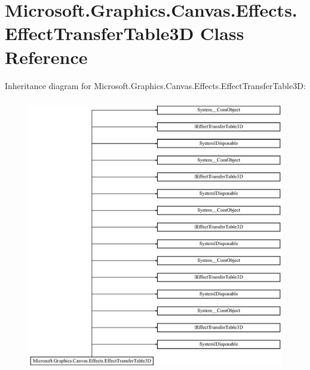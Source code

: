 \hypertarget{class_microsoft_1_1_graphics_1_1_canvas_1_1_effects_1_1_effect_transfer_table3_d}{}\section{Microsoft.\+Graphics.\+Canvas.\+Effects.\+Effect\+Transfer\+Table3D Class Reference}
\label{class_microsoft_1_1_graphics_1_1_canvas_1_1_effects_1_1_effect_transfer_table3_d}
Inheritance diagram for Microsoft.\+Graphics.\+Canvas.\+Effects.\+Effect\+Transfer\+Table3D\+:\begin{figure}[H]
\begin{center}
\leavevmode
\includegraphics[height=12.000000cm]{class_microsoft_1_1_graphics_1_1_canvas_1_1_effects_1_1_effect_transfer_table3_d}
\end{center}
\end{figure}
